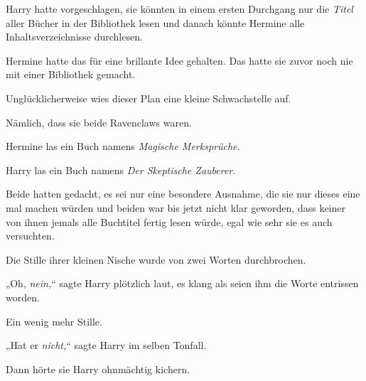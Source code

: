 Harry hatte vorgeschlagen, sie könnten in einem ersten Durchgang nur die \emph{Titel} aller Bücher in der Bibliothek lesen und danach könnte Hermine alle Inhaltsverzeichnisse durchlesen.

Hermine hatte das für eine brillante Idee gehalten. Das hatte sie zuvor noch nie mit einer Bibliothek gemacht.

Unglücklicherweise wies dieser Plan eine kleine Schwachstelle auf.

Nämlich, dass sie beide Ravenclaws waren.

Hermine las ein Buch namens \emph{Magische Merksprüche.}

Harry las ein Buch namens \emph{Der Skeptische Zauberer.}

Beide hatten gedacht, es sei nur eine besondere Ausnahme, die sie nur dieses eine mal machen würden und beiden war bis jetzt nicht klar geworden, dass keiner von ihnen jemals alle Buchtitel fertig lesen würde, egal wie sehr sie es auch versuchten.

Die Stille ihrer kleinen Nische wurde von zwei Worten durchbrochen.

„Oh, \emph{nein,}“ sagte Harry plötzlich laut, es klang als seien ihm die Worte entrissen worden.

Ein wenig mehr Stille.

„Hat er \emph{nicht,}“ sagte Harry im selben Tonfall.

Dann hörte sie Harry ohnmächtig kichern.

